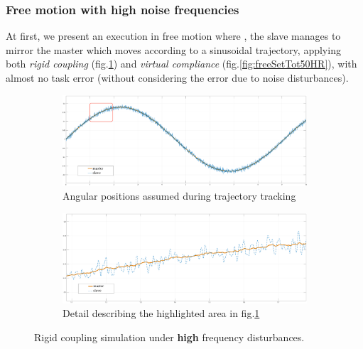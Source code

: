 \subsubsection{Free motion with high noise frequencies}

At first, we present an execution in free motion where , the
slave manages to mirror the master which moves according to a sinusoidal
trajectory,
applying both \textsl{rigid coupling} (fig.\ref{fig:freeRigTot50HR}) and
\textsl{virtual compliance} (fig.\ref{fig:freeSetTot50HR}), with almost no task error
(without considering the error due to noise disturbances).


\begin{figure}[h]
	\begin{subfigure}[h!]{1\linewidth}
		\centering
		\includegraphics[width=\textwidth, height=0.48\textwidth]{Images/rCoupFreeTot50htznoiseRect}
		\caption{Angular positions assumed during trajectory tracking}
		\label{fig:freeRigTot50HR}
	\end{subfigure}	
  \newline
	\begin{subfigure}[h!]{1\linewidth}
		\centering
		\includegraphics[width=\textwidth, height=0.48\textwidth]{Images/rCoupFree50htznoise}
		\caption{Detail describing the highlighted area in fig.\ref{fig:freeRigTot50HR}}
		\label{fig:freeRigPar50HR}
	\end{subfigure}	
  \caption{ Rigid coupling simulation under \textbf{high} frequency disturbances. }
\end{figure}


